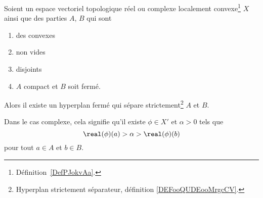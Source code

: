 \begin{theorem} \label{ThoACuKgtW}\label{THOooEOOYooPdTGLi}
	Soient un espace vectoriel topologique réel ou complexe localement convexe\footnote{Définition~\ref{DefPJokvAa}.} \( X\) ainsi que des parties \( A\), \( B\) qui sont
	\begin{enumerate}
		\item
		      des convexes
		\item
		      non vides
		\item
		      disjoints
		\item
		      \( A\) compact et \( B\) soit fermé.
	\end{enumerate}
	Alors il existe un hyperplan fermé qui sépare strictement\footnote{Hyperplan strictement séparateur, définition \ref{DEFooQUDEooMrgcCV}.} \( A\) et \( B\).

	Dans le cas complexe, cela signifie qu'il existe \( \phi\in X'\) et \( \alpha>0\) tels que
	\begin{equation}		\label{EQooTYESooXLtukE}
		\real (\phi)(a)>\alpha>\real(\phi)(b)
	\end{equation}
	pour tout \( a\in A\) et \( b\in B\).
\end{theorem}

